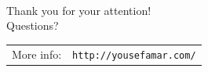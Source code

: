 \documentclass[aspectratio=169]{beamer}
\begin{document}
\begin{frame}[plain,c]
	\begin{center}
		\\[4em]
		\Huge Thank you for your attention!\\[1em]
		\Large Questions?\\[1em]
	\end{center}
	\footnotesize
	\begin{table}[]
		\begin{tabular}{ll}
			More info:&\texttt{http://yousefamar.com/}
		\end{tabular}
	\end{table}
\end{frame}
\end{document}
